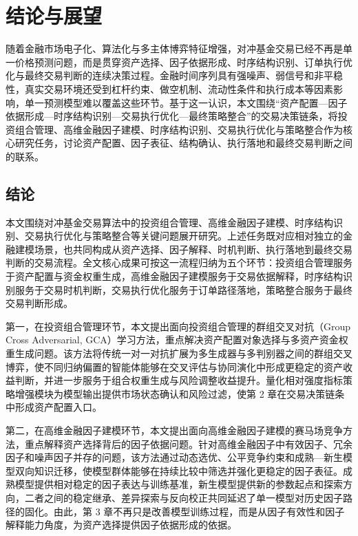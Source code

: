 \chapter{结论与展望}

随着金融市场电子化、算法化与多主体博弈特征增强，对冲基金交易已经不再是单一价格预测问题，而是贯穿资产选择、因子依据形成、时序结构识别、订单执行优化与最终交易判断的连续决策过程。金融时间序列具有强噪声、弱信号和非平稳性，真实交易环境还受到杠杆约束、做空机制、流动性条件和执行成本等因素影响，单一预测模型难以覆盖这些环节。基于这一认识，本文围绕“资产配置—因子依据形成—时序结构识别—交易执行优化—最终策略整合”的交易决策链条，将投资组合管理、高维金融因子建模、时序结构识别、交易执行优化与策略整合作为核心研究任务，讨论资产配置、因子表征、结构确认、执行落地和最终交易判断之间的联系。

\section{结论}

本文围绕对冲基金交易算法中的投资组合管理、高维金融因子建模、时序结构识别、交易执行优化与策略整合等关键问题展开研究。上述任务既对应相对独立的金融建模场景，也共同构成从资产选择、因子解释、时机判断、执行落地到最终交易判断的交易流程。全文核心成果可按这一流程归纳为五个环节：投资组合管理服务于资产配置与资金权重生成，高维金融因子建模服务于交易依据解释，时序结构识别服务于交易时机判断，交易执行优化服务于订单路径落地，策略整合服务于最终交易判断形成。

第一，在投资组合管理环节，本文提出面向投资组合管理的群组交叉对抗（Group Cross Adversarial, GCA）学习方法，重点解决资产配置对象选择与多资产资金权重生成问题。该方法将传统一对一对抗扩展为多生成器与多判别器之间的群组交叉博弈，使不同归纳偏置的智能体能够在交叉评估与协同演化中形成更稳定的资产收益判断，并进一步服务于组合权重生成与风险调整收益提升。量化相对强度指标策略增强模块为模型输出提供市场状态确认和风险过滤，使第 2 章在交易决策链条中形成资产配置入口。

第二，在高维金融因子建模环节，本文提出面向高维金融因子建模的赛马场竞争方法，重点解释资产选择背后的因子依据问题。针对高维金融因子中有效因子、冗余因子和噪声因子并存的问题，该方法通过动态选优、公平竞争约束和成熟—新生模型双向知识迁移，使模型群体能够在持续比较中筛选并强化更稳定的因子表征。成熟模型提供相对稳定的因子表达与训练基准，新生模型提供新的参数起点和探索方向，二者之间的稳定继承、差异探索与反向校正共同延迟了单一模型对历史因子路径的固化。由此，第 3 章不再只是改善模型训练过程，而是从因子有效性和因子解释能力角度，为资产选择提供因子依据形成的依据。

